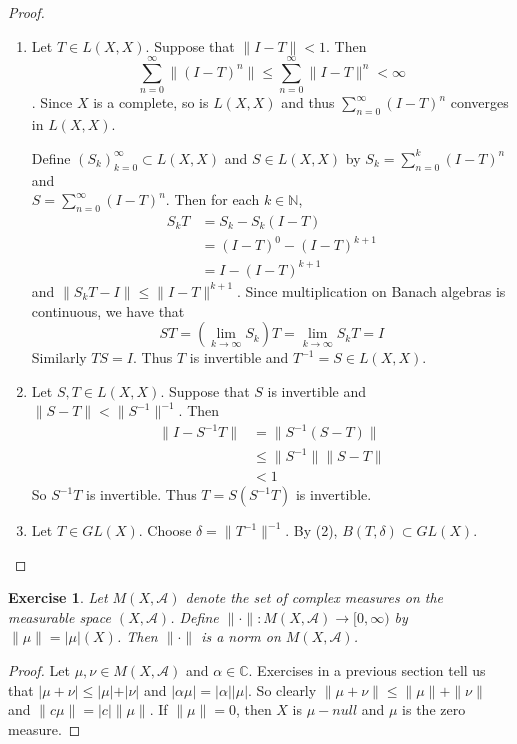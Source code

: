 \documentclass[12pt]{amsart}
\newtheorem{ex}[thm]{Exercise}
\newcommand{\al}{\alpha}
\newcommand{\del}{\delta}
\newcommand{\C}{\mathbb{C}}
\newcommand{\N}{\mathbb{N}}
\newcommand{\MA}{\mathcal{A}}
\newcommand{\Rg}{[0,\infty)}
\begin{document}
	\begin{proof}
		\begin{enumerate}
			\item Let $T \in L(X,X)$. Suppose that $\|I-T \|< 1$. Then $$\sum_{n=0}^{\infty} \|(I -T)^n \| \leq \sum_{n=0}^{\infty} \|I -T \|^{n} < \infty$$. Since $X$ is a complete, so is $L(X,X)$ and thus $\sum\limits_{n=0}^{\infty}(I-T)^n$ converges in $L(X,X)$.
			
			Define $(S_k)_{k=0}^{\infty} \subset L(X,X)$ and $S \in L(X,X)$ by $S_k = \sum\limits_{n=0}^{k} (I-T)^n$ and \\ $S = \sum\limits_{n=0}^{\infty}(I-T)^n$. Then for each $k \in \N$,
			\begin{align*}
				S_k T
				&= S_k - S_k(I-T) \\
				&= (I-T)^0 - (I-T)^{k+1} \\
				&= I - (I-T)^{k+1}
			\end{align*}
			and $\|S_kT - I \|\leq \|I-T \|^{k+1}$. Since multiplication on Banach algebras is continuous, we have that $$ST = (\lim_{k \rightarrow \infty} S_k)T = \lim\limits_{k \rightarrow \infty}S_kT = I$$
			Similarly $TS = I$. Thus $T$ is invertible and $T^{-1} = S \in L(X,X)$. \vspace{.5cm}\\
			\item  Let $S, T \in L(X,X)$. Suppose that $S$ is invertible and $\|S-T \|< \|S^{-1} \|^{-1}$. Then 
			\begin{align*}
				\|I - S^{-1}T \|
				& = \|S^{-1}(S - T) \|\\
				& \leq \|S^{-1} \|\|S -T \|\\
				&< 1
			\end{align*}
			So $S^{-1}T$ is invertible. Thus $T = S (S^{-1}T)$ is invertible. \vspace{.5cm}\\
			\item Let $T \in GL(X)$. Choose $\del = \|T^{-1}\|^{-1}$. By (2), $B(T, \del) \subset GL(X)$.
		\end{enumerate}
	\end{proof}
	
	\begin{ex}
		Let $M(X, \MA)$ denote the set of complex measures on the measurable space $(X, \MA)$. Define $\|\cdot \|: M(X, \MA) \rightarrow \Rg$ by $\|\mu \|= \vert \mu \vert (X)$. Then $\|\cdot \|$ is a norm on $M(X, \MA)$. 
	\end{ex}
	
	\begin{proof}
		Let $\mu, \nu \in M(X, \MA)$ and $\al \in \C$. Exercises in a previous section tell us that $\vert \mu + \nu \vert \leq \vert \mu \vert + \vert \nu \vert$ and $\vert \al \mu \vert = \vert \al \vert \vert \mu \vert$. So clearly $\|\mu + \nu \|\leq \|\mu \|+ \|\nu \|$ and $\|c \mu \|= \vert c \vert \|\mu \|$. If $\|\mu \|= 0$, then $X$ is $\mu-null$ and $\mu$ is the zero measure.
	\end{proof}
	
\end{document}
